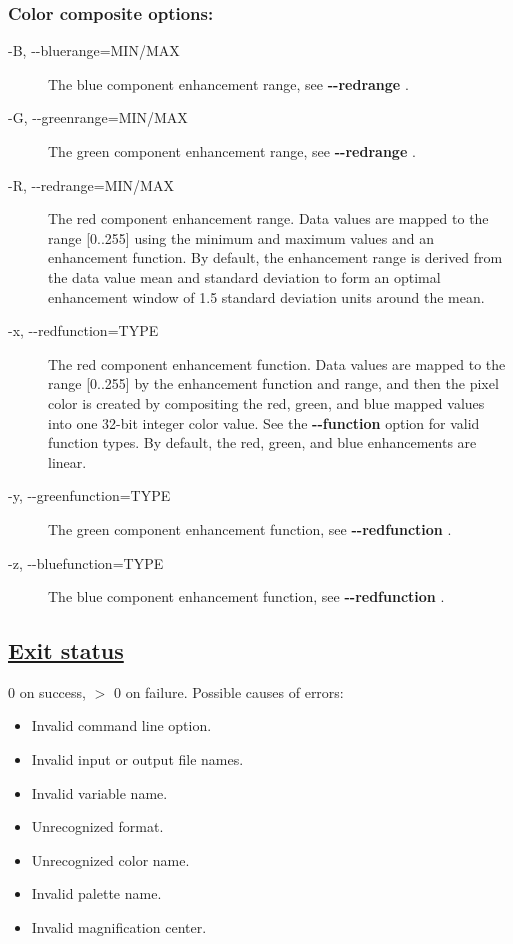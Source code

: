 \subsubsection*{Color composite options:}
\begin{description}
\item[-B, -{-}bluerange=MIN/MAX]The blue component enhancement range, see \textbf{-{-}redrange}
.
\item[-G, -{-}greenrange=MIN/MAX]The green component enhancement range, see \textbf{-{-}redrange}
.
\item[-R, -{-}redrange=MIN/MAX]The red component enhancement range. Data values are mapped to the range [0..255] using the minimum and maximum values and an enhancement function. By default, the enhancement range is derived from the data value mean and standard deviation to form an optimal enhancement window of 1.5 standard deviation units around the mean.
\item[-x, -{-}redfunction=TYPE]The red component enhancement function. Data values are mapped to the range [0..255] by the enhancement function and range, and then the pixel color is created by compositing the red, green, and blue mapped values into one 32-bit integer color value. See the \textbf{-{-}function}
 option for valid function types. By default, the red, green, and blue enhancements are linear.
\item[-y, -{-}greenfunction=TYPE]The green component enhancement function, see \textbf{-{-}redfunction}
.
\item[-z, -{-}bluefunction=TYPE]The blue component enhancement function, see \textbf{-{-}redfunction}
.

\end{description}
\subsection*{\underline{Exit status}}


 0 on success, $>$ 0 on failure. Possible causes of errors: \begin{itemize}
\item  Invalid command line option. 
\item  Invalid input or output file names. 
\item  Invalid variable name. 
\item  Unrecognized format. 
\item  Unrecognized color name. 
\item  Invalid palette name. 
\item  Invalid magnification center. 

\end{itemize}

